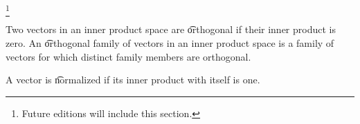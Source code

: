 
\footnote{Future editions will include this section.}


Two vectors in an inner product space are \t{orthogonal} if their inner product is zero.
An \t{orthogonal family of vectors} in an inner product space is a family of vectors for which distinct family members are orthogonal.

A vector is \t{normalized} if its inner product with itself is one.



\blankpage
